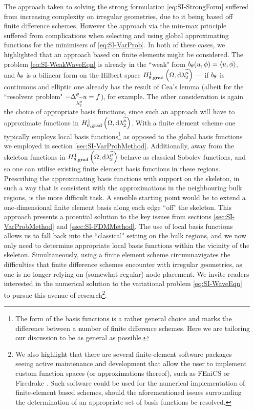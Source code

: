 The approach taken to solving the strong formulation \eqref{eq:SI-StrongForm} suffered from increasing complexity on irregular geometries, due to it being based off finite difference schemes.
However the approach via the min-max principle suffered from complications when selecting and using global approximating functions for the minimisers of \eqref{eq:SI-VarProb}.
In both of these cases, we highlighted that an approach based on finite elements might be considered.
The problem \eqref{eq:SI-WeakWaveEqn} is already in the ``weak" form $b_{\theta}(u,\phi)=\left\langle u , \phi \right\rangle$, and $b_{\theta}$ is a bilinear form on the Hilbert space $H^1_{\theta, \mathrm{grad}}\left( \Omega, \mathrm{d}\lambda_2^{\widetilde{\mu}} \right)$ --- if $b_{\theta}$ is continuous and elliptic one already has the result of Cea's lemma (albeit for the ``resolvent problem" $-\Delta_{\lambda_2^{\widetilde{\mu}}}^\theta u=f$), for example.
The other consideration is again the choice of appropriate basis functions, since such an approach will have to approximate functions in $H^1_{\theta, \mathrm{grad}}\left( \Omega, \mathrm{d}\lambda_2^{\widetilde{\mu}} \right)$.
With a finite element scheme one typically employs local basis functions\footnote{The form of the basis functions is a rather general choice and marks the difference between a number of finite difference schemes. Here we are tailoring our discussion to be as general as possible.} as opposed to the global basis functions we employed in section \ref{sec:SI-VarProbMethod}.
Additionally, away from the skeleton functions in $H^1_{\theta, \mathrm{grad}}\left( \Omega, \mathrm{d}\lambda_2^{\widetilde{\mu}} \right)$ behave as classical Sobolev functions, and so one can utilise existing finite element basis functions in these regions.
Prescribing the approximating basis functions with support on the skeleton, in such a way that is consistent with the approximations in the neighbouring bulk regions, is the more difficult task.
A sensible starting point would be to extend a one-dimensional finite element basis along each edge ``off" the skeleton.
This approach presents a potential solution to the key issues from sections \ref{sec:SI-VarProbMethod} and \ref{ssec:SI-FDMMethod}.
The use of local basis functions allows us to fall back into the ``classical" setting on the bulk regions, and we now only need to determine appropriate local basis functions within the vicinity of the skeleton.
Simultaneously, using a finite element scheme circumnavigates the difficulties that finite difference schemes encounter with irregular geometries, as one is no longer relying on (somewhat regular) node placement.
We invite readers interested in the numerical solution to the variational problem \eqref{eq:SI-WaveEqn} to pursue this avenue of research\footnote{We also highlight that there are several finite-element software packages seeing active maintenance and development that allow the user to implement custom function spaces (or approximations thereof), such as FEniCS \cite{FENICS2022fenics} or Firedrake \cite{Firedrake2022firedrake}.
Such software could be used for the numerical implementation of finite-element based schemes, should the aforementioned issues surrounding the determination of an appropriate set of basis functions be resolved.}.

